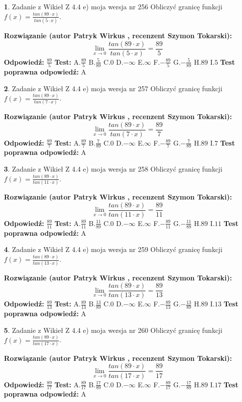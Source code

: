 \documentclass[12pt, a4paper]{article}
\theoremstyle{definition} %
\newtheorem{zad}{}
\newcommand{\zadStart}[1]{\begin{zad}#1\newline}
\newcommand{\zadStop}{\end{zad}}
\newcommand{\rozwStart}[2]{\noindent \textbf{Rozwiązanie (autor #1 , recenzent #2): }\newline}
\newcommand{\rozwStop}{\newline}
\newcommand{\odpStart}{\noindent \textbf{Odpowiedź:}\newline}
\newcommand{\odpStop}{\newline}
\newcommand{\testStart}{\noindent \textbf{Test:}\newline}
\newcommand{\testStop}{\newline}
\newcommand{\kluczStart}{\noindent \textbf{Test poprawna odpowiedź:}\newline}
\newcommand{\kluczStop}{\newline}
\begin{document}
\zadStart{Zadanie z Wikieł Z 4.4 e) moja wersja nr 256}
Obliczyć granicę funkcji $f(x)=\frac{tan(89\cdot x)}{tan(5\cdot x)}$.
\zadStop
\rozwStart{Patryk Wirkus}{Szymon Tokarski}
$$\lim\limits_{x\to 0}\frac{tan(89\cdot x)}{tan(5\cdot x)}=
\frac{89}{5}$$
\rozwStop
\odpStart
$\frac{89}{5}$
\odpStop
\testStart
A.$\frac{89}{5}$
B.$\frac{5}{89}$
C.$0$
D.$-\infty$
E.$\infty$
F.$-\frac{89}{5}$
G.$-\frac{5}{89}$
H.$89$
I.$5$
\testStop
\kluczStart
A
\kluczStop



\zadStart{Zadanie z Wikieł Z 4.4 e) moja wersja nr 257}
Obliczyć granicę funkcji $f(x)=\frac{tan(89\cdot x)}{tan(7\cdot x)}$.
\zadStop
\rozwStart{Patryk Wirkus}{Szymon Tokarski}
$$\lim\limits_{x\to 0}\frac{tan(89\cdot x)}{tan(7\cdot x)}=
\frac{89}{7}$$
\rozwStop
\odpStart
$\frac{89}{7}$
\odpStop
\testStart
A.$\frac{89}{7}$
B.$\frac{7}{89}$
C.$0$
D.$-\infty$
E.$\infty$
F.$-\frac{89}{7}$
G.$-\frac{7}{89}$
H.$89$
I.$7$
\testStop
\kluczStart
A
\kluczStop



\zadStart{Zadanie z Wikieł Z 4.4 e) moja wersja nr 258}
Obliczyć granicę funkcji $f(x)=\frac{tan(89\cdot x)}{tan(11\cdot x)}$.
\zadStop
\rozwStart{Patryk Wirkus}{Szymon Tokarski}
$$\lim\limits_{x\to 0}\frac{tan(89\cdot x)}{tan(11\cdot x)}=
\frac{89}{11}$$
\rozwStop
\odpStart
$\frac{89}{11}$
\odpStop
\testStart
A.$\frac{89}{11}$
B.$\frac{11}{89}$
C.$0$
D.$-\infty$
E.$\infty$
F.$-\frac{89}{11}$
G.$-\frac{11}{89}$
H.$89$
I.$11$
\testStop
\kluczStart
A
\kluczStop



\zadStart{Zadanie z Wikieł Z 4.4 e) moja wersja nr 259}
Obliczyć granicę funkcji $f(x)=\frac{tan(89\cdot x)}{tan(13\cdot x)}$.
\zadStop
\rozwStart{Patryk Wirkus}{Szymon Tokarski}
$$\lim\limits_{x\to 0}\frac{tan(89\cdot x)}{tan(13\cdot x)}=
\frac{89}{13}$$
\rozwStop
\odpStart
$\frac{89}{13}$
\odpStop
\testStart
A.$\frac{89}{13}$
B.$\frac{13}{89}$
C.$0$
D.$-\infty$
E.$\infty$
F.$-\frac{89}{13}$
G.$-\frac{13}{89}$
H.$89$
I.$13$
\testStop
\kluczStart
A
\kluczStop



\zadStart{Zadanie z Wikieł Z 4.4 e) moja wersja nr 260}
Obliczyć granicę funkcji $f(x)=\frac{tan(89\cdot x)}{tan(17\cdot x)}$.
\zadStop
\rozwStart{Patryk Wirkus}{Szymon Tokarski}
$$\lim\limits_{x\to 0}\frac{tan(89\cdot x)}{tan(17\cdot x)}=
\frac{89}{17}$$
\rozwStop
\odpStart
$\frac{89}{17}$
\odpStop
\testStart
A.$\frac{89}{17}$
B.$\frac{17}{89}$
C.$0$
D.$-\infty$
E.$\infty$
F.$-\frac{89}{17}$
G.$-\frac{17}{89}$
H.$89$
I.$17$
\testStop
\kluczStart
A
\kluczStop
\end{document}
